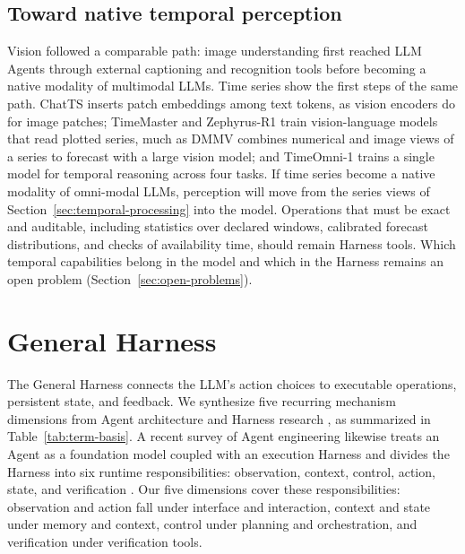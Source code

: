 \documentclass[preprints,article,submit,moreauthors]{Definitions/mdpi}
\begin{document}
\subsection{Toward native temporal perception}
\label{sec:llm-native}

Vision followed a comparable path: image understanding first reached LLM Agents through external captioning and recognition tools before becoming a native modality of multimodal LLMs. Time series show the first steps of the same path. ChatTS \citep{chatts2025} inserts patch embeddings among text tokens, as vision encoders do for image patches; TimeMaster \citep{timemaster2025} and Zephyrus-R1 \citep{zephyrusr12026} train vision-language models that read plotted series, much as DMMV \citep{shen2025multimodalviewenhancedlarge} combines numerical and image views of a series to forecast with a large vision model; and TimeOmni-1 \citep{timeomni2026} trains a single model for temporal reasoning across four tasks. If time series become a native modality of omni-modal LLMs, perception will move from the series views of Section~\ref{sec:temporal-processing} into the model. Operations that must be exact and auditable, including statistics over declared windows, calibrated forecast distributions, and checks of availability time, should remain Harness tools. Which temporal capabilities belong in the model and which in the Harness remains an open problem (Section~\ref{sec:open-problems}).

\section{General Harness}
\label{sec:general-harness}

The General Harness connects the LLM's action choices to executable operations, persistent state, and feedback. We synthesize five recurring mechanism dimensions from Agent architecture and Harness research \citep{sumers2024coala,wang2024agentsurvey,ning2026codeharness,lin2026agenticharness}, as summarized in Table~\ref{tab:term-basis}. A recent survey of Agent engineering likewise treats an Agent as a foundation model coupled with an execution Harness and divides the Harness into six runtime responsibilities: observation, context, control, action, state, and verification \citep{guo2026harnesssurvey}. Our five dimensions cover these responsibilities: observation and action fall under interface and interaction, context and state under memory and context, control under planning and orchestration, and verification under verification tools.
\end{document}
